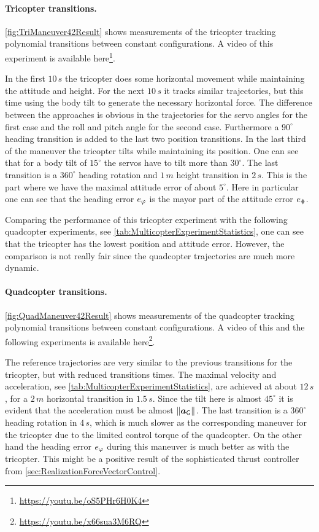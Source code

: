 \paragraph{Tricopter transitions.}
\autoref{fig:TriManeuver42Result} shows measurements of the tricopter tracking polynomial transitions between constant configurations.
A video of this experiment is available here\footnote{\url{https://youtu.be/oS5PHr6H0K4}}.

In the first $10\,\unit{s}$ the tricopter does some horizontal movement while maintaining the attitude and height.
For the next $10\,\unit{s}$ it tracks similar trajectories, but this time using the body tilt to generate the necessary horizontal force.
The difference between the approaches is obvious in the trajectories for the servo angles for the first case and the roll and pitch angle for the second case.
Furthermore a $90^\circ$ heading transition is added to the last two position transitions.
In the last third of the maneuver the tricopter tilts while maintaining its position.
One can see that for a body tilt of $15^\circ$ the servos have to tilt more than $30^\circ$.
The last transition is a $360^\circ$ heading rotation and $1\,\unit{m}$ height transition in $2\,\unit{s}$.
This is the part where we have the maximal attitude error of about $5^\circ$.
Here in particular one can see that the heading error $e_{\varphi}$ is the mayor part of the attitude error $e_{\R}$.

Comparing the performance of this tricopter experiment with the following quadcopter experiments, see \autoref{tab:MulticopterExperimentStatistics}, one can see that the tricopter has the lowest position and attitude error.
However, the comparison is not really fair since the quadcopter trajectories are much more dynamic.

\paragraph{Quadcopter transitions.}
\autoref{fig:QuadManeuver42Result} shows measurements of the quadcopter tracking polynomial transitions between constant configurations.
A video of this and the following experiments is available here\footnote{\url{https://youtu.be/x66sua3M6RQ}}.

The reference trajectories are very similar to the previous transitions for the tricopter, but with reduced transitions times.
The maximal velocity and acceleration, see \autoref{tab:MulticopterExperimentStatistics}, are achieved at about $12\,\unit{s}$, for a $2\,\unit{m}$ horizontal transition in $1.5\,\unit{s}$.
Since the tilt here is almost $45^\circ$ it is evident that the acceleration must be almost $\| \boldsymbol{a}_{\mathsf{G}} \|_{}$.
The last transition is a $360^\circ$ heading rotation in $4\,\unit{s}$, which is much slower as the corresponding maneuver for the tricopter due to the limited control torque of the quadcopter.
On the other hand the heading error $e_{\varphi}$ during this maneuver is much better as with the tricopter.
This might be a positive result of the sophisticated thrust controller from \autoref{sec:RealizationForceVectorControl}.

